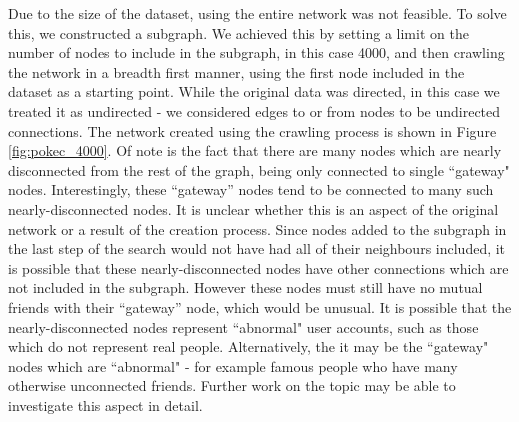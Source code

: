\documentclass[bsc,frontabs,twoside,singlespacing,parskip,deptreport]{infthesis}     %
\begin{document}
Due to the size of the dataset, using the entire network was not feasible. To solve this, we constructed a subgraph. We achieved this by setting a limit on the number of nodes to include in the subgraph, in this case 4000, and then crawling the network in a breadth first manner, using the first node included in the dataset as a starting point. While the original data was directed, in this case we treated it as undirected - we considered edges to or from nodes to be undirected connections. The network created using the crawling process is shown in Figure \ref{fig:pokec_4000}. Of note is the fact that there are many nodes which are nearly disconnected from the rest of the graph, being only connected to single ``gateway" nodes. Interestingly, these ``gateway'' nodes tend to be connected to many such nearly-disconnected nodes. It is unclear whether this is an aspect of the original network or a result of the creation process. Since nodes added to the subgraph in the last step of the search would not have had all of their neighbours included, it is possible that these nearly-disconnected nodes have other connections which are not included in the subgraph. However these nodes must still have no mutual friends with their ``gateway'' node, which would be unusual. It is possible that the nearly-disconnected nodes represent ``abnormal" user accounts, such as those which do not represent real people. Alternatively, the it may be the ``gateway" nodes which are ``abnormal" - for example famous people who have many otherwise unconnected friends. Further work on the topic may be able to investigate this aspect in detail.
\end{document}
